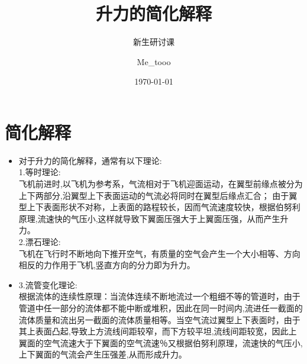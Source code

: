 \documentclass{beamer}
\author{Me\_tooo}
\title{升力的简化解释}
\subtitle{新生研讨课}
\institute{}     %
\date{\today}
\begin{document}
    \kaishu {}
	
	\begin{frame}
		\titlepage
	\end{frame}
	
	\begin{frame}
		\tableofcontents[sectionstyle=show,subsectionstyle=show/shaded/hide,subsubsectionstyle=show/shaded/hide]
	\end{frame}
		
	
	\section{简化解释}
	
		\begin{frame}
			\begin{itemize}
				\item 对于升力的简化解释，通常有以下理论:\\
				1.等时理论:\\
				飞机前进时,以飞机为参考系，气流相对于飞机迎面运动，在翼型前缘点被分为上下两部分,沿翼型上下表面运动的气流必将同时在翼型后缘点汇合； 由于翼型上下表面形状不对称，上表面的路程较长，因而气流速度较快，根据伯努利原理,流速快的气压小,这样就导致下翼面压强大于上翼面压强，从而产生升力。\\
				2.漂石理论:\\
				飞机在飞行时不断地向下推开空气，有质量的空气会产生一个大小相等、方向相反的力作用于飞机,竖直方向的分力即为升力。
			\end{itemize}
		\end{frame}
		\begin{frame}
			\begin{itemize}
				\item3.流管变化理论:\\
				根据流体的连续性原理：当流体连续不断地流过一个粗细不等的管道时，由于管道中任一部分的流体都不能中断或堆积，因此在同一时间内,流进任一截面的流体质量和流出另一截面的流体质量相等。当空气流过翼型上下表面时，由于其上表面凸起,导致上方流线间距较窄，而下方较平坦,流线间距较宽，因此上翼面的空气流速大于下翼面的空气流速％又根据伯努利原理，流速快的气压小,上下翼面的气流会产生压强差,从而形成升力。
			\end{itemize}
		\end{frame}
\end{document}
